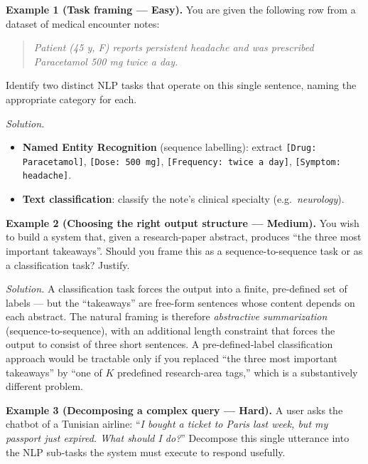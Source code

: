 \textbf{Example 1 (Task framing --- Easy).}
You are given the following row from a dataset of medical encounter notes:
\begin{quote}
\emph{Patient (45 y, F) reports persistent headache and was prescribed Paracetamol 500 mg twice a day.}
\end{quote}
Identify two distinct NLP tasks that operate on this single sentence, naming the appropriate category for each.

\textit{Solution.}
\begin{itemize}
    \item \textbf{Named Entity Recognition} (sequence labelling): extract \texttt{[Drug: Paracetamol]}, \texttt{[Dose: 500 mg]}, \texttt{[Frequency: twice a day]}, \texttt{[Symptom: headache]}.
    \item \textbf{Text classification}: classify the note's clinical specialty (e.g.\ \emph{neurology}).
\end{itemize}

\medskip

\textbf{Example 2 (Choosing the right output structure --- Medium).}
You wish to build a system that, given a research-paper abstract, produces ``the three most important takeaways''. Should you frame this as a sequence-to-sequence task or as a classification task? Justify.

\textit{Solution.} A classification task forces the output into a finite, pre-defined set of labels --- but the ``takeaways'' are free-form sentences whose content depends on each abstract. The natural framing is therefore \emph{abstractive summarization} (sequence-to-sequence), with an additional length constraint that forces the output to consist of three short sentences.
A pre-defined-label classification approach would be tractable only if you replaced ``the three most important takeaways'' by ``one of $K$ predefined research-area tags,'' which is a substantively different problem.

\medskip

\textbf{Example 3 (Decomposing a complex query --- Hard).}
A user asks the chatbot of a Tunisian airline: ``\emph{I bought a ticket to Paris last week, but my passport just expired. What should I do?}'' Decompose this single utterance into the NLP sub-tasks the system must execute to respond usefully.

